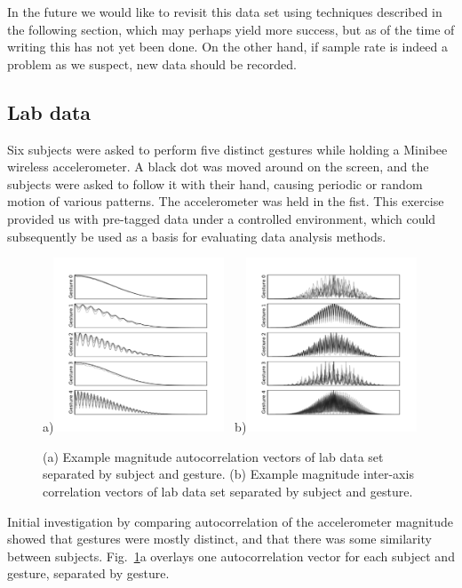 \documentclass{article}
\begin{document}
In the future we would like to revisit this data set using techniques
described in the following section, which may perhaps yield more
success, but as of the time of writing this has not yet been done.
On the other hand, if sample rate is indeed a problem as we suspect,
new data should be recorded.

\subsection{Lab data}

Six subjects were asked to perform five distinct gestures while
holding a Minibee wireless accelerometer.
A black dot was moved around on the screen, and the subjects were
asked to follow it with their hand, causing periodic or random motion
of various patterns.
The accelerometer was held in the fist.
This exercise provided us with pre-tagged data under a controlled
environment, which could subsequently be used as a basis for
evaluating data analysis methods.

\begin{figure}
a)\includegraphics[width=2in]{autocor.pdf}
~b)\includegraphics[width=2in]{axescor.pdf}
\caption{(a) Example magnitude autocorrelation vectors of lab data set
  separated by subject and gesture.
  (b) Example magnitude inter-axis correlation vectors of lab data set
  separated by subject and gesture.}
\label{fig:autocor}
\end{figure}

Initial investigation by comparing autocorrelation of the
accelerometer magnitude showed that gestures were mostly distinct, and
that there was some similarity between subjects.
Fig.~\ref{fig:autocor}a overlays one autocorrelation vector for each
subject and gesture, separated by gesture.
\end{document}
